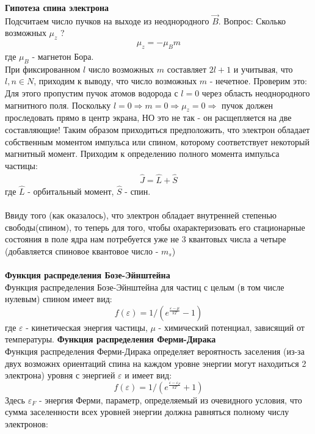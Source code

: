 \documentclass[__minimum__.tex]{subfiles}
\begin{document}
	\begin{figure}[h]
	\end{figure}
	\textbf{Гипотеза спина электрона}\\
	Подсчитаем число пучков на выходе из неоднородного $\vec{B}$. Вопрос: Сколько возможных $\mu_z$ ?
	\begin{gather*}
		\mu_z = -\mu_Bm
	\end{gather*}
	где $\mu_B$ - магнетон Бора.\\
	При фиксированном $l$ число возможных $m$ составляет $2l+1$ и учитывая, что $l,n \in N$, приходим к выводу, что число возможных $m$ - нечетное. Проверим это:\\
	Для этого пропустим пучок атомов водорода с $l=0$ через область неоднородного магнитного поля. Поскольку $l = 0 \Rightarrow m = 0 \Rightarrow \mu_z = 0 \Rightarrow$ пучок должен проследовать прямо в центр экрана, НО это не так - он расщепляется на две составляющие! Таким образом приходиться предположить, что электрон обладает собственным моментом импульса или спином, которому соответствует некоторый магнитный момент. Приходим к определению полного момента импульса частицы:
	\begin{gather*}
		\hat{J} = \hat{L}+\hat{S}
	\end{gather*} 
	где $\hat{L}$ - орбитальный момент, $\hat{S}$ - спин.\\\\
	Ввиду того (как оказалось), что электрон обладает внутренней степенью свободы(спином), то теперь для того, чтобы охарактеризовать его стационарные состояния в поле ядра нам потребуется уже не 3 квантовых числа а четыре (добавляется спиновое квантовое число - $m_s$)\\\\
	\textbf{Функция распределения Бозе-Эйнштейна}\\
	Функция распределения Бозе-Эйнштейна для частиц с целым (в том числе нулевым) спином имеет вид:
	$$f(\varepsilon) = 1/(e^{\frac{\varepsilon - \mu}{kT}} - 1)$$
	где $\varepsilon$ - кинетическая энергия частицы, $\mu$ - химический потенциал, зависящий от температуры.
	\textbf{Функция распределения Ферми-Дирака}\\
	Функция распределения Ферми-Дирака определяет вероятность заселения (из-за двух возможнх ориентаций спина на каждом уровне энергии могут находиться 2 электрона) уровня с энергией $\varepsilon$ и имеет вид:
	$$f(\varepsilon) = 1/(e^{\frac{\varepsilon - \varepsilon_F}{kT}} + 1)$$
	Здесь $\varepsilon_F$ - энергия Ферми, параметр, определяемый из очевидного условия, что сумма заселенности всех уровней энергии должна равняться полному числу электронов:
\end{document}
